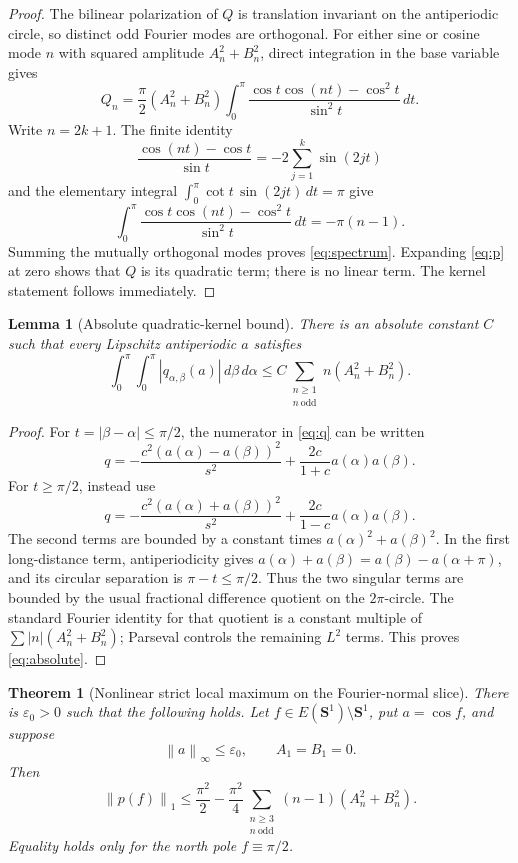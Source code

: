 \documentclass[11pt]{article}
\newtheorem{theorem}{Theorem}
\newtheorem{lemma}{Lemma}
\newcommand{\norm}[1]{\left\lVert#1\right\rVert}
\begin{document}
\begin{proof}
The bilinear polarization of $Q$ is translation invariant on the antiperiodic circle, so distinct odd Fourier modes are orthogonal.  For either sine or cosine mode $n$ with squared amplitude $A_n^2+B_n^2$, direct integration in the base variable gives
\[
 Q_n=\frac\pi2(A_n^2+B_n^2)
 \int_0^\pi\frac{\cos t\cos(nt)-\cos^2t}{\sin^2t}\,dt.
\]
Write $n=2k+1$.  The finite identity
\[
 \frac{\cos(nt)-\cos t}{\sin t}=-2\sum_{j=1}^k\sin(2jt)
\]
and the elementary integral
$\int_0^\pi\cot t\,\sin(2jt)\,dt=\pi$ give
\[
 \int_0^\pi\frac{\cos t\cos(nt)-\cos^2t}{\sin^2t}\,dt
 =-\pi(n-1).
\]
Summing the mutually orthogonal modes proves \eqref{eq:spectrum}.  Expanding \eqref{eq:p} at zero shows that $Q$ is its quadratic term; there is no linear term.  The kernel statement follows immediately.
\end{proof}

\begin{lemma}[Absolute quadratic-kernel bound]\label{lem:absolute}
There is an absolute constant $C$ such that every Lipschitz antiperiodic $a$ satisfies
\begin{equation}\label{eq:absolute}
 \int_0^\pi\int_0^\pi |q_{\alpha,\beta}(a)|\,d\beta\,d\alpha
 \le C\sum_{\substack{n\ge1\\n\ \mathrm{odd}}}n(A_n^2+B_n^2).
\end{equation}
\end{lemma}

\begin{proof}
For $t=|\beta-\alpha|\le\pi/2$, the numerator in \eqref{eq:q} can be written
\[
 q=-\frac{c^2(a(\alpha)-a(\beta))^2}{s^2}
   +\frac{2c}{1+c}a(\alpha)a(\beta).
\]
For $t\ge\pi/2$, instead use
\[
 q=-\frac{c^2(a(\alpha)+a(\beta))^2}{s^2}
   +\frac{2c}{1-c}a(\alpha)a(\beta).
\]
The second terms are bounded by a constant times $a(\alpha)^2+a(\beta)^2$.  In the first long-distance term, antiperiodicity gives
$a(\alpha)+a(\beta)=a(\beta)-a(\alpha+\pi)$, and its circular separation is $\pi-t\le\pi/2$.  Thus the two singular terms are bounded by the usual fractional difference quotient on the $2\pi$-circle.  The standard Fourier identity for that quotient is a constant multiple of
$\sum |n|(A_n^2+B_n^2)$; Parseval controls the remaining $L^2$ terms.  This proves \eqref{eq:absolute}.
\end{proof}

\begin{theorem}[Nonlinear strict local maximum on the Fourier-normal slice]\label{thm:local}
There is $\varepsilon_0>0$ such that the following holds.  Let
$f\in E(\mathbf S^1)\setminus\mathbf S^1$, put $a=\cos f$, and suppose
\[
 \norm a_\infty\le\varepsilon_0,
 \qquad A_1=B_1=0.
\]
Then
\begin{equation}\label{eq:local}
 \norm{p(f)}_1\le\frac{\pi^2}{2}
 -\frac{\pi^2}{4}
 \sum_{\substack{n\ge3\\n\ \mathrm{odd}}}(n-1)(A_n^2+B_n^2).
\end{equation}
Equality holds only for the north pole $f\equiv\pi/2$.
\end{theorem}
\end{document}

